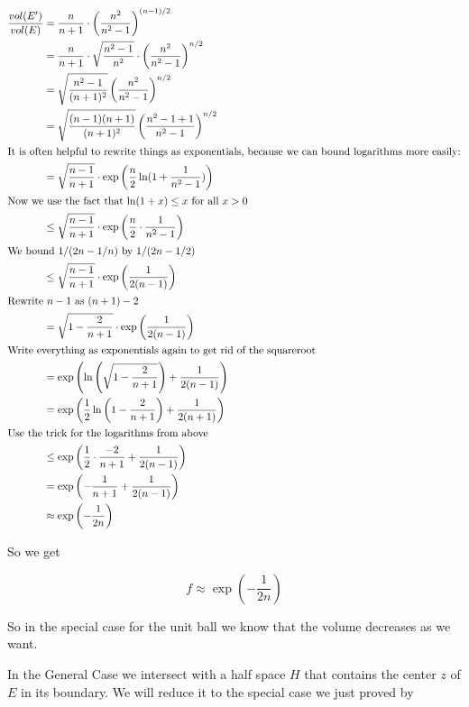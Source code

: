 \begin{pr}
\begin{align*}\frac{vol(E')}{vol(E)}&=\frac{n}{n+1}\cdot \left(\frac{n^2}{n^2-1}\right)^{(n-1)/2}\\
&= \frac{n}{n+1}\cdot \sqrt{\frac{n^2-1}{n^2}} \cdot \left(\frac{n^2}{n^2-1}\right)^{n/2}\\
&=\sqrt{\frac{n^2-1}{(n+1)^2}} \left(\frac{n^2}{n^2-1}\right)^{n/2}\\
&=\sqrt{\frac{(n-1)(n+1)}{(n+1)^2}} \left(\frac{n^2-1+1}{n^2-1}\right)^{n/2}\\
\intertext{It is often helpful to rewrite things as exponentials, because we can bound logarithms more easily:}
&= \sqrt{\frac{n-1}{n+1}} \cdot \exp\left(\frac{n}{2} \ln (1+\frac{1}{n^2-1})\right)\\
\intertext{Now we use the fact that $\ln (1+x)\leq x$ for all $x>0$}
&\leq \sqrt{\frac{n-1}{n+1}} \cdot \exp\left(\frac{n}{2} \cdot \frac{1}{n^2-1}\right)\\
\intertext{We bound $1/(2n-1/n)$ by $1/(2n-1/2)$}
&\leq \sqrt{\frac{n-1}{n+1}} \cdot \exp\left(\frac{1}{2(n-1)}\right)\\
\intertext{Rewrite $n-1$ as $(n+1)-2$}
&=\sqrt{1-\frac{2}{n+1}}\cdot \exp\left(\frac{1}{2(n-1)}\right)\\
\intertext{Write everything as exponentials again to get rid of the squareroot}
&= \exp \left(\ln\left(\sqrt{1-\frac{2}{n+1}}\right)+\frac{1}{2(n-1)}\right)\\
&=\exp \left(\frac{1}{2}\ln \left(1-\frac{2}{n+1}\right) +\frac{1}{2(n+1)}\right)\\
\intertext{Use the trick for the logarithms from above}
&\leq \exp \left(\frac{1}{2} \cdot \frac{-2}{n+1} + \frac{1}{2(n-1)}\right)\\
&= \exp \left(-\frac{1}{n+1}+\frac{1}{2(n-1)}\right)\\
&\approx \exp \left(-\frac{1}{2n}\right)
\end{align*}

So we get

\[f \approx \exp \left(-\frac{1}{2n}\right)\]

\end{pr}

So in the special case for the unit ball we know that the volume decreases as we want.

In the General Case we intersect with a half space $H$ that contains the center $z$ of $E$ in its boundary. We will reduce it to the special case we just proved by

